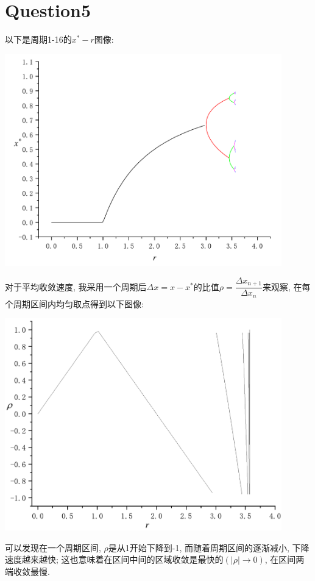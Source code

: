 \documentclass[UTF8]{ctexart}
\begin{document}
    \section{Question5}
        \indent 以下是周期1-16的$x^*-r$图像:
        \begin{center}
            \includegraphics[width=12cm]{t1-16.pdf}
        \end{center}
        对于平均收敛速度, 我采用一个周期后$\Delta x=x-x^*$的比值$\rho=\dfrac{\Delta x_{n+1}}{\Delta x_n}$来观察,
        在每个周期区间内均匀取点得到以下图像:
        \begin{center}
            \includegraphics[width=12cm]{rho.pdf}
        \end{center}
        可以发现在一个周期区间, $\rho$是从1开始下降到-1, 而随着周期区间的逐渐减小, 下降速度越来越快;
        这也意味着在区间中间的区域收敛是最快的$(|\rho|\rightarrow 0)$, 在区间两端收敛最慢.
\end{document}
